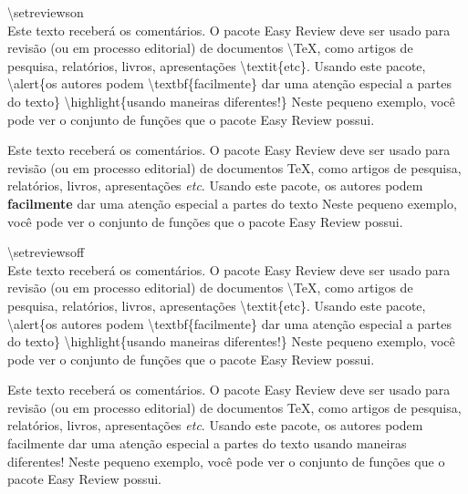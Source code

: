 \documentclass[12pt,openright,oneside,a4paper,sumario=tradicional,brazil]{abntex2}
\begin{document}
\begin{minipage}{0.45\textwidth}
\textbackslash setreviewson\\
Este texto receberá os comentários. O pacote Easy Review  deve ser usado para revisão (ou em processo editorial) de documentos \textbackslash TeX, como artigos de pesquisa, relatórios, livros, apresentações \textbackslash textit\{etc\}. Usando este pacote, \textbackslash alert\{os autores podem \textbackslash textbf\{facilmente\} dar uma atenção especial a partes do texto\} \textbackslash highlight\{usando maneiras diferentes!\} Neste pequeno exemplo, você pode ver o conjunto de funções que o pacote Easy Review possui.
\end{minipage}\hfill
\begin{minipage}{0.45\textwidth}
\setreviewson
Este texto receberá os comentários. O pacote Easy Review  deve ser usado para revisão (ou em processo editorial) de documentos \TeX, como artigos de pesquisa, relatórios,
livros, apresentações \textit{etc}. Usando este pacote, \alert{os autores podem \textbf{facilmente} dar uma atenção especial a partes do texto}  Neste pequeno exemplo, você pode ver o conjunto de funções que o pacote Easy Review possui.
\end{minipage}\vspace{2cm}

\begin{minipage}{0.45\textwidth}
\textbackslash setreviewsoff\\
Este texto receberá os comentários. O pacote Easy Review  deve ser usado para revisão (ou em processo editorial) de documentos \textbackslash TeX, como artigos de pesquisa, relatórios, livros, apresentações \textbackslash textit\{etc\}. Usando este pacote, \textbackslash alert\{os autores podem \textbackslash textbf\{facilmente\} dar uma atenção especial a partes do texto\} \textbackslash highlight\{usando maneiras diferentes!\} Neste pequeno exemplo, você pode ver o conjunto de funções que o pacote Easy Review possui.
\end{minipage}\hfill
\begin{minipage}{0.45\textwidth}
\setreviewsoff
Este texto receberá os comentários. O pacote Easy Review  deve ser usado para revisão (ou em processo editorial) de documentos \TeX, como artigos de pesquisa, relatórios,
livros, apresentações \textit{etc}. Usando este pacote, \alert{os autores podem facilmente dar uma atenção especial a partes do texto} usando maneiras diferentes! Neste pequeno exemplo, você pode ver o conjunto de funções que o pacote Easy Review possui.
\end{minipage}
\end{document}
